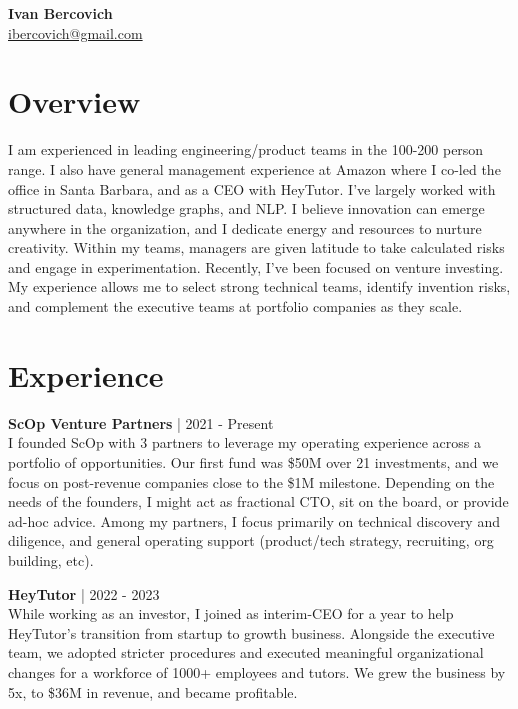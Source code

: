 \documentclass[a4paper,10pt]{article}
\begin{document}
\noindent
\textbf{\Large Ivan Bercovich} \\
\href{mailto:ibercovich@gmail.com}{ibercovich@gmail.com} \\
\vspace{0cm}

\section*{Overview}
\noindent
I am experienced in leading engineering/product teams in the 100-200 person range. I also have general management experience at Amazon where I co-led the office in Santa Barbara, and as a CEO with HeyTutor. I've largely worked with structured data, knowledge graphs, and NLP. I believe innovation can emerge anywhere in the organization, and I dedicate energy and resources to nurture creativity. Within my teams, managers are given latitude to take calculated risks and engage in experimentation. Recently, I’ve been focused on venture investing. My experience allows me to select strong technical teams, identify invention risks, and complement the executive teams at portfolio companies as they scale.

\section*{Experience}

\noindent
\textbf{ScOp Venture Partners} | 2021 - Present \\
I founded ScOp with 3 partners to leverage my operating experience across a portfolio of opportunities. Our first fund was \$50M over 21 investments, and we focus on post-revenue companies close to the \$1M milestone. Depending on the needs of the founders, I might act as fractional CTO, sit on the board, or provide ad-hoc advice. Among my partners, I focus primarily on technical discovery and diligence, and general operating support (product/tech strategy, recruiting, org building, etc).

\vspace{5pt} %

\noindent
\textbf{HeyTutor} | 2022 - 2023 \\
While working as an investor, I joined as interim-CEO for a year to help HeyTutor's transition from startup to growth business. Alongside the executive team, we adopted stricter procedures and executed meaningful organizational changes for a workforce of 1000+ employees and tutors. We grew the business by 5x, to \$36M in revenue, and became profitable.
\end{document}
